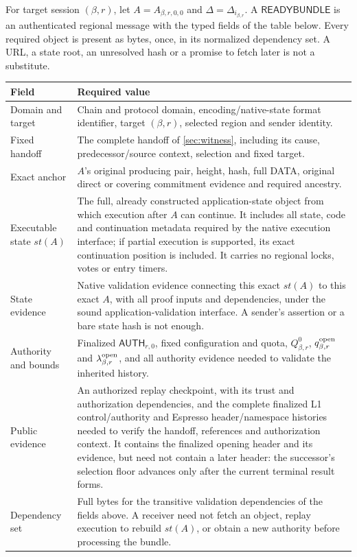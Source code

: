 \documentclass[11pt,a4paper]{article}
\newcommand{\tagg}[1]{\ensuremath{\mathsf{#1}}}
\newcounter{protocol}
\begin{document}
For target session $(\beta,r)$, let $A=A_{\beta,r,0,0}$ and
$\Delta=\Delta_{i_{\beta,r}}$. A \tagg{READYBUNDLE} is an authenticated
regional message with the typed fields of the table below. Every required
object is present as bytes, once, in its normalized dependency set. A
URL, a state root, an unresolved hash or a promise to fetch later is not
a substitute.
\begin{table}[htbp]\centering\small
\begin{tabularx}{\linewidth}{@{}>{\raggedright\arraybackslash}p{.25\linewidth}Y@{}}\toprule
Field & Required value\\\midrule
Domain and target & Chain and protocol domain, encoding/native-state
format identifier, target $(\beta,r)$, selected region and sender identity.\\
Fixed handoff & The complete handoff of \cref{sec:witness}, including
its cause, predecessor/source context, selection and fixed target.\\
Exact anchor & $A$'s original producing pair, height, hash, full DATA,
original direct or covering commitment evidence and required ancestry.\\
Executable state $\mathit{st}(A)$ & The full, already constructed application-state
object from which execution after $A$ can continue. It includes all state,
code and continuation metadata required by the native execution interface;
if partial execution is supported, its exact continuation position is
included. It carries no regional locks, votes or entry timers.\\
State evidence & Native validation evidence connecting this exact
$\mathit{st}(A)$ to this exact $A$, with all proof inputs and dependencies, under the
sound application-validation interface. A sender's assertion or a bare
state hash is not enough.\\
Authority and bounds & Finalized $\tagg{AUTH}_{r,0}$, fixed configuration
and quota, $Q^0_{\beta,r}$, $q^{\rm open}_{\beta,r}$ and
$\lambda^{\rm open}_{\beta,r}$, and all authority evidence needed to
validate the inherited history.\\
Public evidence & An authorized replay checkpoint, with its trust and
authorization dependencies, and the complete finalized L1
control/authority and Espresso header/namespace histories needed to
verify the handoff, references and authorization context. It contains the
finalized opening header and its evidence, but need not contain a later
header: the successor's selection floor advances only after the current
terminal result forms.\\
Dependency set & Full bytes for the transitive validation dependencies
of the fields above. A receiver need not fetch an object, replay
execution to rebuild $\mathit{st}(A)$, or obtain a new authority before processing
the bundle.\\\bottomrule
\end{tabularx}
\end{table}
\end{document}
